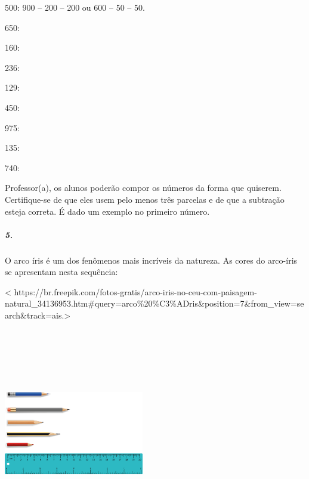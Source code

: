 500: 900 -- 200 -- 200 ou 600 -- 50 -- 50.

650:

160:

236:

129:

450:

975:

135:

740:

Professor(a), os alunos poderão compor os números da forma que quiserem.
Certifique-se de que eles usem pelo menos três parcelas e de que a subtração
esteja correta. É dado um exemplo no primeiro número.

\subparagraph{5.}\label{section-18}

O arco íris é um dos fenômenos mais incríveis da natureza. As cores do
arco-íris se apresentam nesta sequência:

\textless{}
https://br.freepik.com/fotos-gratis/arco-iris-no-ceu-com-paisagem-natural\_34136953.htm\#query=arco\%20\%C3\%ADris\&position=7\&from\_view=search\&track=ais.\textgreater{}

\includegraphics[width=2.40278in,height=3.60417in]{media/image30.png}

